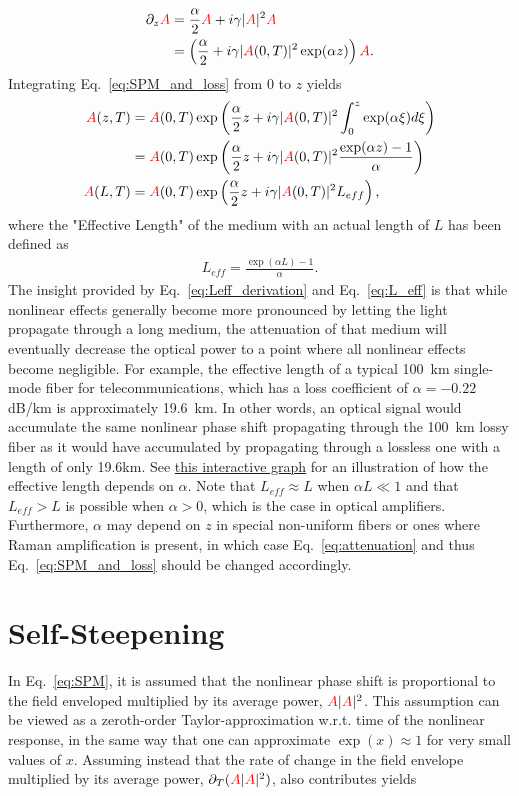 \begin{align}
\label{eq:SPM_and_loss}
    \partial_z\textcolor{red}{A} &= \frac{\alpha}{2}\textcolor{red}{A} +i\gamma|\textcolor{red}{A}|^2\textcolor{red}{A}\\ \nonumber
    &=\left(\frac{\alpha}{2} +i\gamma |\textcolor{red}{A}(0,T)|^2 \exp(\alpha z) \right)\textcolor{red}{A}. 
\end{align}
Integrating Eq.~\ref{eq:SPM_and_loss} from $0$ to $z$ yields
\begin{align}
    \label{eq:Leff_derivation}
    \textcolor{red}{A}(z,T)&=\textcolor{red}{A}(0,T) \exp\left( \frac{\alpha}{2}z+i\gamma|\textcolor{red}{A}(0,T)|^2 \int_0^z \exp(\alpha\xi) d\xi  \right) \\ \nonumber
    &=\textcolor{red}{A}(0,T) \exp\left( \frac{\alpha}{2}z+i\gamma|\textcolor{red}{A}(0,T)|^2  \frac{\exp(\alpha z)-1}{\alpha}   \right) \\ \nonumber
    \textcolor{red}{A}(L,T)&=\textcolor{red}{A}(0,T) \exp\left( \frac{\alpha}{2}z+i\gamma|\textcolor{red}{A}(0,T)|^2  L_{eff}   \right),
\end{align}
where the "Effective Length" of the medium with an actual length of $L$ has been defined as
\begin{align}
\label{eq:L_eff}
    L_{eff}= \frac{\exp(\alpha L)-1}{\alpha}.
\end{align}
The insight provided by Eq.~\ref{eq:Leff_derivation} and Eq.~\ref{eq:L_eff} is that while nonlinear effects generally become more pronounced by letting the light propagate through a long medium, the attenuation of that medium will eventually decrease the optical power to a point where all nonlinear effects become negligible. For example, the effective length of a typical 100~km single-mode fiber for telecommunications, which has a loss coefficient of $\alpha=-0.22$dB/km is approximately 19.6~km. In other words, an optical signal would accumulate the same nonlinear phase shift propagating through the 100~km lossy fiber as it would have accumulated by propagating through a lossless one with a length of only 19.6km. See \href{https://www.desmos.com/calculator/g6dadbxq33}{this interactive graph} for an illustration of how the effective length depends on $\alpha$. Note that $L_{eff}\approx L$ when $\alpha L\ll 1$ and that $L_{eff}>L$ is possible when $\alpha>0$, which is the case in optical amplifiers. Furthermore, $\alpha$ may depend on $z$ in special non-uniform fibers or ones where Raman amplification is present, in which case Eq.~\ref{eq:attenuation} and thus Eq.~\ref{eq:SPM_and_loss} should be changed accordingly.   

\section{Self-Steepening}
\label{sec:SS}
In Eq.~\ref{eq:SPM}, it is assumed that the nonlinear phase shift is proportional to the field enveloped multiplied by its average power, $\textcolor{red}{A}|\textcolor{red}{A}|^2$. This assumption can be viewed as a zeroth-order Taylor-approximation w.r.t. time of the nonlinear response, in the same way that one can approximate $\exp(x)\approx 1$ for very small values of $x$. Assuming instead that the rate of change in the field envelope multiplied by its average power, $\partial_T(\textcolor{red}{A}|\textcolor{red}{A}|^2)$, also contributes yields

